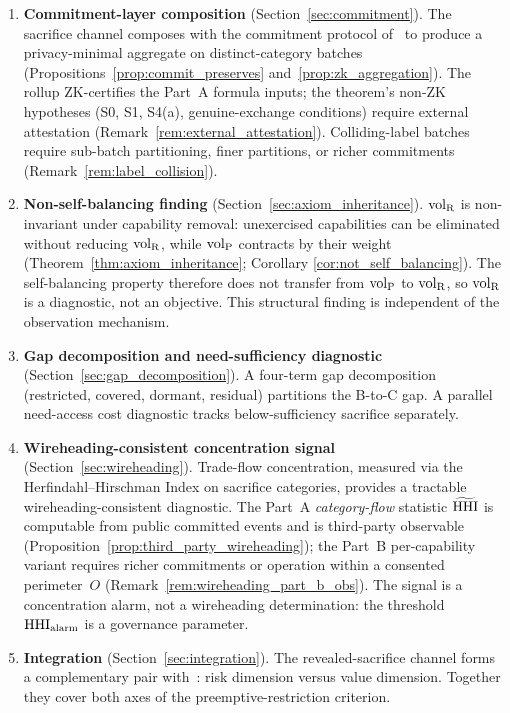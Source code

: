 \begin{enumerate}
\item \textbf{Commitment-layer composition}
  (Section~\ref{sec:commitment}).
  The sacrifice channel composes with the commitment protocol
  of~\citep{lasser2026exo} to produce a privacy-minimal
  aggregate on distinct-category batches
  (Propositions~\ref{prop:commit_preserves}
  and~\ref{prop:zk_aggregation}).  The rollup ZK-certifies the
  Part~A formula inputs; the theorem's non-ZK hypotheses (S0,
  S1, S4(a), genuine-exchange conditions) require external
  attestation (Remark~\ref{rem:external_attestation}).
  Colliding-label batches require sub-batch partitioning,
  finer partitions, or richer commitments
  (Remark~\ref{rem:label_collision}).

\item \textbf{Non-self-balancing finding}
  (Section~\ref{sec:axiom_inheritance}).
  ${\operatorname{vol}_{\mathrm{R}}}$ is non-invariant under capability removal: unexercised
  capabilities can be eliminated without reducing ${\operatorname{vol}_{\mathrm{R}}}$, while
  ${\operatorname{vol}_{\mathrm{P}}}$ contracts by their weight
  (Theorem~\ref{thm:axiom_inheritance}; Corollary
  \ref{cor:not_self_balancing}).  The self-balancing property
  therefore does not transfer from ${\operatorname{vol}_{\mathrm{P}}}$ to ${\operatorname{vol}_{\mathrm{R}}}$, so ${\operatorname{vol}_{\mathrm{R}}}$
  is a diagnostic, not an objective.  This structural finding is
  independent of the observation mechanism.

\item \textbf{Gap decomposition and need-sufficiency diagnostic}
  (Section~\ref{sec:gap_decomposition}).
  A four-term gap decomposition (restricted, covered, dormant,
  residual) partitions the B-to-C gap.  A parallel need-access
  cost diagnostic tracks below-sufficiency sacrifice separately.

\item \textbf{Wireheading-consistent concentration signal}
  (Section~\ref{sec:wireheading}).
  Trade-flow concentration, measured via the Herfindahl--Hirschman
  Index on sacrifice categories, provides a tractable
  wireheading-consistent diagnostic.  The Part~A
  \emph{category-flow} statistic $\widetilde{\mathrm{HHI}}$ is computable
  from public committed events and is third-party observable
  (Proposition~\ref{prop:third_party_wireheading}); the Part~B
  per-capability variant requires richer commitments or
  operation within a consented perimeter~$O$
  (Remark~\ref{rem:wireheading_part_b_obs}).  The signal is a
  concentration alarm, not a wireheading determination: the
  threshold $\mathrm{HHI}_{\mathrm{alarm}}$ is a governance parameter.

\item \textbf{Integration}
  (Section~\ref{sec:integration}).
  The revealed-sacrifice channel forms a complementary pair
  with~\citep{lasser2026wamura}: risk dimension versus value
  dimension.  Together they cover both axes of the
  preemptive-restriction criterion.
\end{enumerate}

